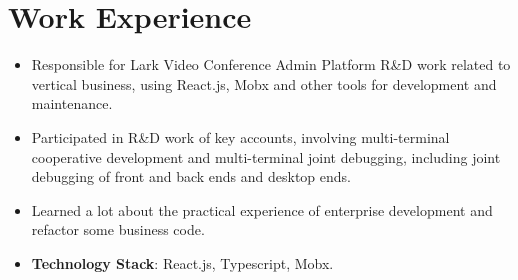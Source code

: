 \documentclass{resume}
\newcommand{\en}[1]{#1}
\newcommand{\zh}[1]{}
\begin{document}
\section{\en{Work Experience}\zh{工作经历}}
\en{}
\zh{\datedsubsection{\textbf{\href{https://www.bytedance.com/zh/}{字节跳动（ByteDance Inc.）}}}{2021/07 -- 2021/09}}
\en{}
\zh{\role{飞书会议室解决方案团队}{前端研发实习}}
\begin{itemize}
  \item \en{Responsible for Lark Video Conference Admin Platform R\&D work related to vertical business, using React.js, Mobx and other tools for development and maintenance.}
        \zh{负责飞书会议室 Admin 中会议室模块和视频会议模块相关垂直业务的前端研发，使用 React.js 和 Mobx 等工具进行业务等开发和维护}
  \item \en{Participated in R\&D work of key accounts, involving multi-terminal cooperative development and multi-terminal joint debugging, including joint debugging of front and back ends and desktop ends.}
        \zh{参与重点客户相关需求的开发，涉及到了多端合作开发与多端联合调试，包括前后端以及桌面端的联合调试，学到了很多联合调试开发经验}
  \item \en{Learned a lot about the practical experience of enterprise development and refactor some business code.}
        \zh{学到了很多关于 React.js，Typescript 以及企业级开发流程的实战经验，并对部分业务代码进行重构，例如使用 React Hooks 和 functional components 替代 class based components}
  \item \en{\textbf{Technology Stack}: React.js, Typescript, Mobx.}
        \zh{\textbf{技术栈}: React.js, Typescript, Mobx}
\end{itemize}
\end{document}
